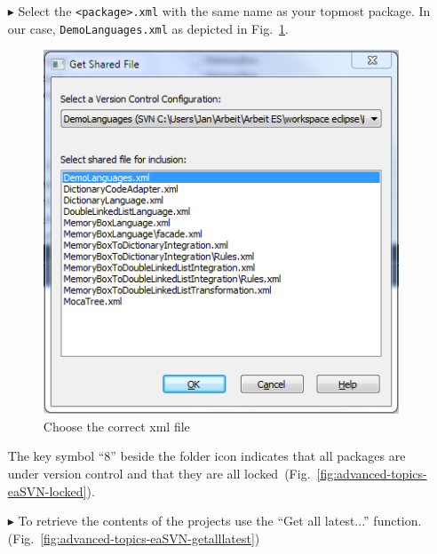\begin{enumerate}
 \item[$\blacktriangleright$] Select the \texttt{<package>.xml} with the same name as your topmost package. 
 In our case, \texttt{DemoLanguages.xml} as depicted in Fig.~\ref{fig:advanced-topics-eaSVN-selectxml}.
\begin{figure}[htbp]
\begin{center}
\includegraphics[height=0.4\textheight]{pics/advancedTopics/eaSVN/DemoLanguages/005.png}
	\caption{Choose the correct xml file}
  	\label{fig:advanced-topics-eaSVN-selectxml}
\end{center}
\end{figure}
The key symbol ``8'' beside the folder icon indicates that all packages are under version control and that they are all locked~(Fig.~\ref{fig:advanced-topics-eaSVN-locked}).

\item[$\blacktriangleright$] To retrieve the contents of the projects use the ``Get all latest...'' function. 
(Fig.~\ref{fig:advanced-topics-eaSVN-getalllatest})


\end{enumerate}
